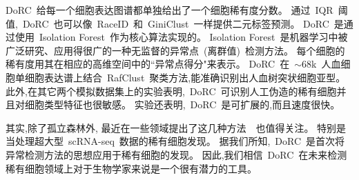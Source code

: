DoRC~给每一个细胞表达图谱都单独给出了一个细胞稀有度分数。
通过~IQR~阈值,~DoRC~也可以像~RaceID~和~GiniClust~一样提供二元标签预测。
DoRC~是通过使用~Isolation Forest~作为核心算法实现的。
Isolation Forest~是机器学习中被广泛研究、应用得很广的一种无监督的异常点~(离群值)~检测方法。
每个细胞的稀有度用其在相应的高维空间中的``异常点得分"来表示。
DoRC~在~${\sim}68$k~人血细胞单细胞表达谱上结合~RafClust~聚类方法,能准确识别出人血树突状细胞亚型。
此外,在其它两个模拟数据集上的实验表明,~DoRC~可识别人工伪造的稀有细胞并且对细胞类型特征也很敏感。
实验还表明,~DoRC~是可扩展的,而且速度很快。


其实,除了孤立森林外,
最近在一些领域提出了这几种方法~\cite{aggarwal2015theoretical,zhao2019pyod,liu2019generative,weng2019multi}~也值得关注。
特别是当处理超大型~scRNA-seq~数据的稀有细胞发现。
据我们所知,~DoRC~是首次将异常检测方法的思想应用于稀有细胞的发现。
因此,我们相信~DoRC~在未来检测稀有细胞领域上对于生物学家来说是一个很有潜力的工具。
